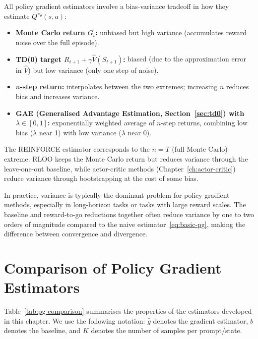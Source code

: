 All policy gradient estimators involve a bias-variance tradeoff in how they estimate $Q^{\pi_\theta}(s,a)$:
\begin{itemize}[leftmargin=*]
\item \textbf{Monte Carlo return $G_t$:} unbiased but high variance (accumulates reward noise over the full episode).
\item \textbf{TD(0) target $R_{t+1} + \gamma \hat V(S_{t+1})$:} biased (due to the approximation error in $\hat V$) but low variance (only one step of noise).
\item \textbf{$n$-step return:} interpolates between the two extremes; increasing $n$ reduces bias and increases variance.
\item \textbf{GAE (Generalised Advantage Estimation, Section~\ref{sec:td0}) with $\lambda \in [0,1]$:} exponentially weighted average of $n$-step returns, combining low bias ($\lambda$ near 1) with low variance ($\lambda$ near 0).
\end{itemize}

The REINFORCE estimator corresponds to the $n = T$ (full Monte Carlo) extreme.  RLOO keeps the Monte Carlo return but reduces variance through the leave-one-out baseline, while actor-critic methods (Chapter~\ref{ch:actor-critic}) reduce variance through bootstrapping at the cost of some bias.

\begin{remark}
\label{rem:variance-dominates}
In practice, variance is typically the dominant problem for policy gradient methods, especially in long-horizon tasks or tasks with large reward scales.  The baseline and reward-to-go reductions together often reduce variance by one to two orders of magnitude compared to the naive estimator~\eqref{eq:basic-pg}, making the difference between convergence and divergence.
\end{remark}

\section{Comparison of Policy Gradient Estimators}
\label{sec:pg-comparison}


Table~\ref{tab:pg-comparison} summarises the properties of the estimators developed in this chapter.  We use the following notation: $\hat g$ denotes the gradient estimator, $b$ denotes the baseline, and $K$ denotes the number of samples per prompt/state.

